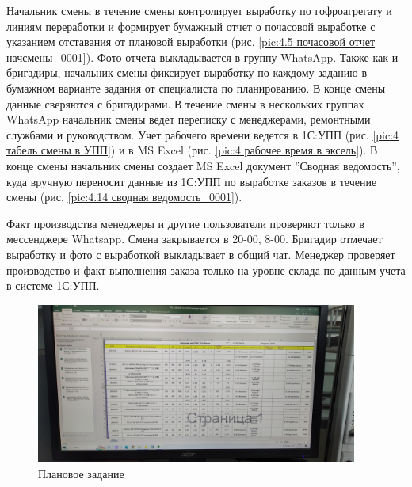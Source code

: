 Начальник смены в течение смены контролирует выработку по гофроагрегату и линиям переработки и формирует бумажный отчет о почасовой выработке с указанием отставания от плановой выработки (рис. \ref{pic:4.5 почасовой отчет начсмены_0001}). Фото отчета выкладывается в группу WhatsApp. Также как и бригадиры, начальник смены фиксирует выработку по каждому заданию в бумажном варианте задания от специалиста по планированию. В конце смены данные сверяются с бригадирами. В течение смены в нескольких группах WhatsApp начальник смены ведет переписку с менеджерами, ремонтными службами и руководством. Учет рабочего времени ведется в 1С:УПП (рис. \ref{pic:4 табель смены в УПП}) и в MS Excel (рис. \ref{pic:4 рабочее время в эксель}). В конце смены начальник смены создает MS Excel документ ''Сводная ведомость'', куда вручную переносит данные из 1С:УПП по выработке заказов в течение смены (рис. \ref{pic:4.14 сводная ведомость_0001}).


Факт производства менеджеры и другие пользователи проверяют только в мессенджере Whatsapp. 
Смена закрывается в 20-00, 8-00. Бригадир отмечает выработку и фото с выработкой выкладывает в общий чат. 
Менеджер проверяет производство и факт выполнения заказа только на уровне склада по данным учета в системе 1С:УПП.



\clearpage

\begin{figure}
\begin{center}
  \includegraphics[height=0.94\textheight, width=0.94\textwidth, keepaspectratio]{Pics 1/5 Задание от плановика на сухой части.jpg }
\end{center}
  \caption{Плановое задание}
  \label{pic:5 Задание от плановика на сухой части}
\end{figure}

